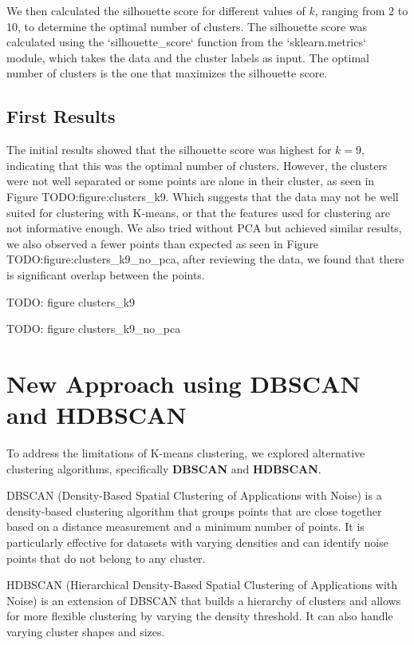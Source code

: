 We then calculated the silhouette score for different values of $k$, ranging from 2 to 10, to determine the optimal number 
of clusters. The silhouette score was calculated using the `silhouette_score` function from the `sklearn.metrics` module, 
which takes the data and the cluster labels as input. The optimal number of clusters is the one that maximizes the silhouette
score. 

\subsection{First Results}
\label{subsec:first_results}

The initial results showed that the silhouette score was highest for $k=9$, indicating that this was the optimal number of clusters.
However, the clusters were not well separated or some points are alone in their cluster, as seen in Figure {TODO:figure:clusters_k9}.
Which suggests that the data may not be well suited for clustering with K-means, or that the features used for clustering are not 
informative enough. We also tried without PCA but achieved similar results, we also observed a fewer points than expected as seen in
Figure {TODO:figure:clusters_k9_no_pca}, after reviewing the data, we found that there is significant overlap between the points.

TODO: figure clusters_k9

TODO: figure clusters_k9_no_pca

\section{New Approach using DBSCAN and HDBSCAN}
\label{subsec:new_approach_dbscan_hdbscan}

To address the limitations of K-means clustering, we explored alternative clustering algorithms, specifically 
\textbf{DBSCAN} and \textbf{HDBSCAN}.

DBSCAN (Density-Based Spatial Clustering of Applications with Noise) is a density-based clustering algorithm that
groups points that are close together based on a distance measurement and a minimum number of points. It is particularly 
effective for datasets with varying densities and can identify noise points that do not belong to any cluster.

HDBSCAN (Hierarchical Density-Based 
Spatial Clustering of Applications with Noise) is an extension of DBSCAN that builds a hierarchy of clusters and allows for
more flexible clustering by varying the density threshold. It can also handle varying cluster shapes and sizes.

